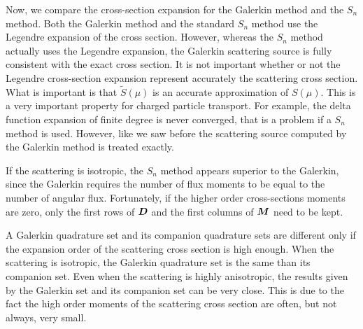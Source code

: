 Now, we compare the cross-section expansion for the Galerkin method and
the $S_n$ method. Both the Galerkin method and the standard $S_n$ method use
the Legendre expansion of the cross section. However, whereas the $S_n$ method
actually uses the Legendre expansion, the Galerkin scattering source is
fully consistent with the exact cross section. It is not
important whether or not the Legendre cross-section expansion represent
accurately the scattering cross section. What is important is that
$\tilde{S}(\mu)$ is an accurate approximation of $S(\mu)$. This is a very
important property for charged particle transport. For example, the delta
function expansion of finite degree is never converged, that is a problem if a 
$S_n$ method is used. However, like we saw before the scattering source computed 
by the Galerkin method is treated exactly.

If the scattering is isotropic, the $S_n$ method appears superior to the
Galerkin, since the Galerkin requires the number of flux moments to be equal
to the number of angular flux. Fortunately, if the higher order cross-sections
moments are zero, only the first rows of $\boldsymbol{D}$ and the first columns of
$\boldsymbol{M}$ need to be kept.

A Galerkin quadrature set and its companion quadrature sets are different only
if the expansion order of the scattering cross section is high enough. When the 
scattering is isotropic, the Galerkin quadrature set is the same than its
companion set. Even when the scattering is highly anisotropic, the results
given by the Galerkin set and its companion set can be very close. This is due
to the fact the high order moments of the scattering cross section are often,
but not always, very small.
